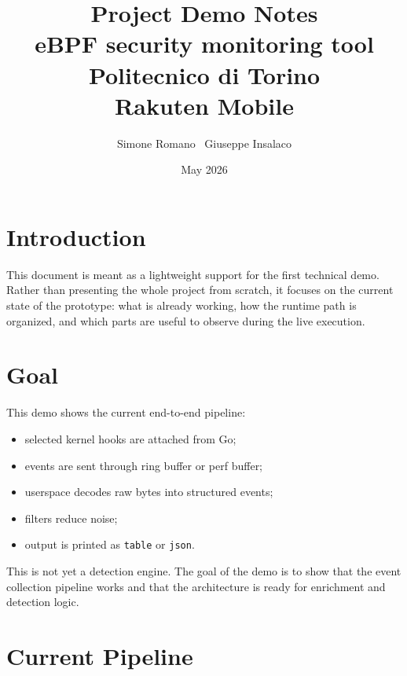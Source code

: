 \documentclass[11pt,a4paper]{article}
\title{\textbf{Project Demo Notes}\\
\large eBPF security monitoring tool\\[0.5em]
\normalsize Politecnico di Torino\\
\normalsize Rakuten Mobile}
\author{Simone Romano \ Giuseppe Insalaco}
\date{May 2026}
\begin{document}
\maketitle

\section*{Introduction}

This document is meant as a lightweight support for the first technical demo.
Rather than presenting the whole project from scratch, it focuses on the
current state of the prototype: what is already working, how the runtime path is
organized, and which parts are useful to observe during the live execution.

\section{Goal}

This demo shows the current end-to-end pipeline:

\begin{itemize}
  \item selected kernel hooks are attached from Go;
  \item events are sent through ring buffer or perf buffer;
  \item userspace decodes raw bytes into structured events;
  \item filters reduce noise;
  \item output is printed as \texttt{table} or \texttt{json}.
\end{itemize}

This is not yet a detection engine. The goal of the demo is to show that the
event collection pipeline works and that the architecture is ready for
enrichment and detection logic.

\section{Current Pipeline}
\end{document}
